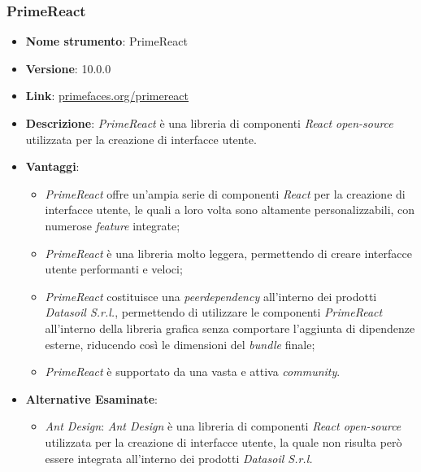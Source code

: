 \subsubsection{PrimeReact}
\begin{itemize}
    \item \textbf{Nome strumento}: PrimeReact
    \item \textbf{Versione}: 10.0.0
    \item \textbf{Link}: \href{https://primefaces.org/primereact}{primefaces.org/primereact}
    \item \textbf{Descrizione}: \textit{PrimeReact} è una libreria di componenti \textit{React open-source} utilizzata per la creazione di interfacce utente.
    \item \textbf{Vantaggi}:
          \begin{itemize}
              \item \textit{PrimeReact} offre un'ampia serie di componenti \textit{React} per la creazione di interfacce utente, le quali a loro volta sono altamente personalizzabili, con numerose \textit{feature} integrate;
              \item \textit{PrimeReact} è una libreria molto leggera, permettendo di creare interfacce utente performanti e veloci;
              \item \textit{PrimeReact} costituisce una \textit{\gls{peerdependency}\glox} all'interno dei prodotti \textit{Datasoil S.r.l.}, permettendo di utilizzare le componenti \textit{PrimeReact} all'interno
                    della libreria grafica senza comportare l'aggiunta di dipendenze esterne, riducendo così le dimensioni del \textit{bundle} finale;
              \item \textit{PrimeReact} è supportato da una vasta e attiva \textit{community}.
          \end{itemize}
    \item \textbf{Alternative Esaminate}:
          \begin{itemize}
              \item \textit{Ant Design}: \textit{Ant Design} è una libreria di componenti \textit{React open-source} utilizzata per la creazione di interfacce utente, la quale non risulta però
                    essere integrata all'interno dei prodotti \textit{Datasoil S.r.l.}
          \end{itemize}
\end{itemize}


